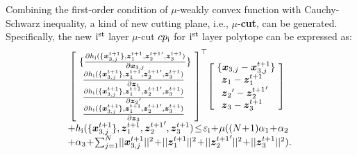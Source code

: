 \documentclass[letterpaper]{article} %
\begin{document}
Combining the first-order condition of $\mu$-weakly convex function with Cauchy-Schwarz inequality, a kind of new cutting plane, i.e., ${\mu}$-\textbf{cut}, can be generated. Specifically, the new ${\rm{\uppercase\expandafter{\romannumeral1}}}^{\rm{st}}$ layer $\mu$-cut ${cp_{\rm{\uppercase\expandafter{\romannumeral1}}}}$ for ${\rm{\uppercase\expandafter{\romannumeral1}}}^{\rm{st}}$ layer polytope can be expressed as:
\begin{equation}
\label{eq:new_inner_cp}
\begin{array}{l}
{\left[ \! \begin{array}{l}
\{\frac{{\partial h_{\rm{\uppercase\expandafter{\romannumeral1}}}(\{{\boldsymbol{x}_{3,j}^{t+1}}\},\boldsymbol{z}_1^{t+1}, {\boldsymbol{z}_2^{t+1}}',\boldsymbol{z}_3^{t+1} )}}{{\partial {\boldsymbol{x}_{3,j}}}} \}\\
\, \, \frac{{\partial h_{\rm{\uppercase\expandafter{\romannumeral1}}}(\{{\boldsymbol{x}_{3,j}^{t+1}}\},\boldsymbol{z}_1^{t+1}, {\boldsymbol{z}_2^{t+1}}',\boldsymbol{z}_3^{t+1} )}}{{\partial \boldsymbol{z}_1}} \\
\, \,  \frac{{\partial h_{\rm{\uppercase\expandafter{\romannumeral1}}}(\{{\boldsymbol{x}_{3,j}^{t+1}}\},\boldsymbol{z}_1^{t+1}, {\boldsymbol{z}_2^{t+1}}',\boldsymbol{z}_3^{t+1} )}}{{\partial {\boldsymbol{z}_2}'}} \\
\, \,  \frac{{\partial h_{\rm{\uppercase\expandafter{\romannumeral1}}}(\{{\boldsymbol{x}_{3,j}^{t+1}}\},\boldsymbol{z}_1^{t+1}, {\boldsymbol{z}_2^{t+1}}',\boldsymbol{z}_3^{t+1} )}}{{\partial \boldsymbol{z}_3}}
\end{array} \! \right]^{\top}}\! \left[\! \begin{array}{l}
\{ \boldsymbol{x}_{3,j} - \boldsymbol{x}_{3,j}^{t+1} \}\\
\; \,  \boldsymbol{z}_1 - \boldsymbol{z}_1^{t+1}  \\
\; \,  {\boldsymbol{z}_2}' - {\boldsymbol{z}_2^{t+1}}' \\
\; \,  \boldsymbol{z}_3 - \boldsymbol{z}_3^{t+1}
\end{array} \! \right] \\

\!+h_{\rm{\uppercase\expandafter{\romannumeral1}}}(\{{\boldsymbol{x}_{3,j}^{t+1}}\},\boldsymbol{z}_1^{t+1}, {\boldsymbol{z}_2^{t+1}}',\boldsymbol{z}_3^{t+1} )
\! \le \! \varepsilon_{\rm{\uppercase\expandafter{\romannumeral1}}} \! +\! \mu ((N\!+\!1)\alpha_1 \!+ \! \alpha_2
\\
\!+\alpha_3  \!+\! \sum\nolimits_{j = 1}^N \!||\boldsymbol{x}_{3,j}^{t+1}||^2 \!+\! ||\boldsymbol{z}_1^{t+1}||^2 \!+\! ||{\boldsymbol{z}_2^{t+1}}'||^2 \!+\! ||\boldsymbol{z}_3^{t+1}||^2).
\end{array}
\end{equation}
\end{document}
